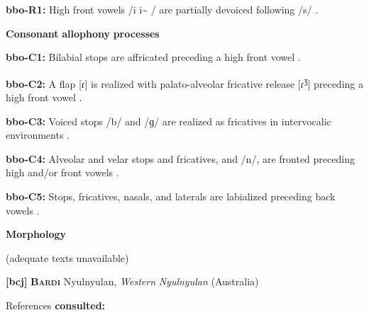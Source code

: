 \documentclass[output=paper]{langsci/langscibook}
\begin{document}
\begin{styleBody}
\textbf{bbo-R1:} High front vowels /i i\~{} / are partially devoiced following /s/ \citep[28-9]{Morse1976}.
\end{styleBody}

\begin{styleBody}
\textbf{Consonant} \textbf{allophony} \textbf{processes}
\end{styleBody}

\begin{styleBody}
\textbf{bbo-C1:} Bilabial stops are affricated preceding a high front vowel \citep[20]{Morse1976}.
\end{styleBody}

\begin{styleBody}
\textbf{bbo-C2:} A flap [ɾ] is realized with palato-alveolar fricative release [ɾ\textsuperscript{ʒ}] preceding a high front vowel \citep[25]{Morse1976}.
\end{styleBody}

\begin{styleBody}
\textbf{bbo-C3:} Voiced stops /b/ and /ɡ/ are realized as fricatives in intervocalic environments \citep[22]{Morse1976}.
\end{styleBody}

\begin{styleBody}
\textbf{bbo-C4:} Alveolar and velar stops and fricatives, and /n/, are fronted preceding high and/or front vowels \citep[20-23]{Morse1976}.
\end{styleBody}

\begin{styleBody}
\textbf{bbo-C5:} Stops, fricatives, nasals, and laterals are labialized preceding back vowels \citep[20]{Morse1976}.
\end{styleBody}

\begin{styleBody}
\textbf{Morphology}
\end{styleBody}

\begin{styleBody}
(adequate texts unavailable)
\end{styleBody}

\begin{styleBody}
\textbf{[bcj]}   \textbf{\textsc{Bardi}  }  Nyulnyulan, \textit{Western} \textit{Nyulnyulan} (Australia)
\end{styleBody}

\begin{styleBody}
References \textbf{consulted:} \citet{Bowern2012}
\end{styleBody}
\end{document}
